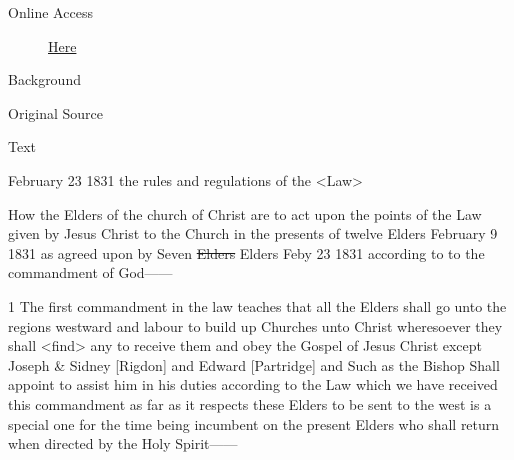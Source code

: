 			\begin{description}
				\item[Online Access] \href{https://www.josephsmithpapers.org/paper-summary/revelation-23-february-1831-dc-4274-93/1}{Here}
			\end{description}
			
			\begin{description}
				\item[Background]
			\end{description}
			
			
			\begin{description}
				\item[Original Source]
			\end{description}
			
			
			\begin{description}
				\item[Text]
			\end{description}
				
				\begin{tightcenter}
				February 23 1831 the rules and regulations of the <Law>
				\end{tightcenter}
				
				How the Elders of the church of Christ are to act upon the points of the Law given by Jesus Christ to the Church in the presents of twelve Elders February 9 1831 as agreed upon by Seven \sout{Elders} Elders Feby 23 1831 according to to the commandment of God------
				
				1 The first commandment in the law teaches that all the Elders shall go unto the regions westward and labour to build up Churches unto Christ wheresoever they shall <find> any to receive them and obey the Gospel of Jesus Christ except Joseph \& Sidney [Rigdon] and Edward [Partridge] and Such as the Bishop Shall appoint to assist him in his duties according to the Law which we have received this commandment as far as it respects these Elders to be sent to the west is a special one for the time being incumbent on the present Elders who shall return when directed by the Holy Spirit------
				
